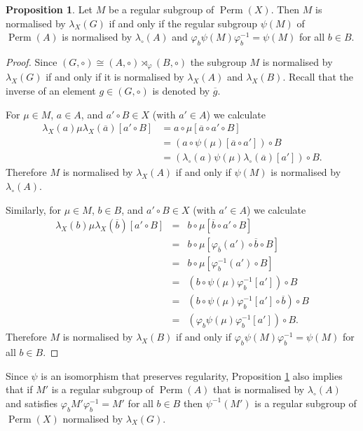 \documentclass[12pt,a4paper, reqno]{amsart}
\theoremstyle{definition}
\newtheorem{proposition}[theorem]{Proposition}
\renewcommand{\bar}{\overline}
\DeclareMathOperator{\Perm}{\mbox{Perm}}
\begin{document}
\begin{proposition} \label{prop_induced_X_to_A}
Let $ M $ be a regular subgroup of $ \Perm(X) $. Then $ M $ is normalised by $ \lambda_{X}(G) $ if and only if the regular subgroup $ \psi(M) $ of $ \Perm(A) $ is normalised by $ \lambda_{\circ}(A) $ and $ \varphi_{b} \psi(M) \varphi_{b}^{-1} = \psi(M) $ for all $ b \in B $. 
\end{proposition}
\begin{proof}
Since $ (G,\circ) \cong (A,\circ) \rtimes_{\varphi} (B,\circ) $ the subgroup $ M $ is normalised by $ \lambda_{X}(G) $ if and only if it is normalised by $ \lambda_{X}(A) $ and $ \lambda_{X}(B) $. Recall that the inverse of an element $ g \in (G,\circ) $ is denoted by $ \bar{g} $. 

For $ \mu \in M $, $ a \in A $, and $ a' \circ B \in X $ (with $ a' \in A $) we calculate
\begin{align*}
\lambda_{X}(a) \mu \lambda_{X}(\bar{a})[ a' \circ B]
& = a \circ \mu[\bar{a} \circ a' \circ B] \\
& = (a \circ \psi(\mu)[\bar{a} \circ a']) \circ B \tag{ by the definition of $ \psi $} \\
& = (\lambda_{\circ}(a) \psi(\mu) \lambda_{\circ}(\bar{a})[a']) \circ B. 
\end{align*}
Therefore $ M $ is normalised by $ \lambda_{X}(A) $ if and only if $ \psi(M) $ is normalised by $ \lambda_{\circ}(A) $.

Similarly, for $ \mu \in M $, $ b \in B $, and $ a' \circ B \in X $ (with $ a' \in A $) we calculate 
\begin{eqnarray*}
\lambda_{X}(b) \mu \lambda_{X}(\bar{b})[ a' \circ B]
& = & b \circ \mu[\bar{b} \circ a' \circ B] \\
& = & b \circ \mu[\varphi_{\bar{b}}(a') \circ \bar{b} \circ B] \\
& = & b \circ \mu[\varphi_{b}^{-1}(a') \circ B] \\
& = & (b \circ \psi(\mu)\varphi_{b}^{-1}[a']) \circ B \\
& = & (b \circ \psi(\mu)\varphi_{b}^{-1}[a'] \circ \bar{b}) \circ B \\
& = & (\varphi_{b}\psi(\mu)\varphi_{b}^{-1}[a']) \circ B.
\end{eqnarray*}
Therefore $ M $ is normalised by $ \lambda_{X}(B) $ if and only if $ \varphi_{b} \psi(M) \varphi_{b}^{-1} = \psi(M) $ for all $ b \in B $. 
\end{proof}

Since $ \psi $ is an isomorphism that preserves regularity, Proposition \ref{prop_induced_X_to_A} also implies that if $ M' $ is a regular subgroup of $ \Perm(A) $ that is normalised by $ \lambda_{\circ}(A) $ and satisfies $ \varphi_{b} M' \varphi_{b}^{-1} = M' $ for all $ b \in B $ then $ \psi^{-1}(M') $ is a regular subgroup of $ \Perm(X) $ normalised by $ \lambda_{X}(G) $.
\end{document}
